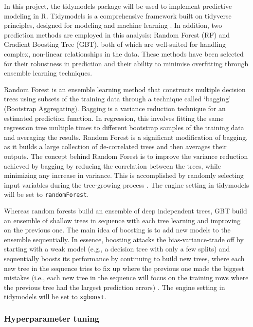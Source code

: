 \documentclass[11pt,a4paper,]{article}
\begin{document}
In this project, the tidymodels package will be used to implement predictive modeling in R. Tidymodels is a comprehensive framework built on tidyverse principles, designed for modeling and machine learning \autocite{tidymodels}. In addition, two prediction methods are employed in this analysis: Random Forest (RF) and Gradient Boosting Tree (GBT), both of which are well-suited for handling complex, non-linear relationships in the data. These methods have been selected for their robustness in prediction and their ability to minimise overfitting through ensemble learning techniques.

Random Forest is an ensemble learning method that constructs multiple decision trees using subsets of the training data through a technique called `bagging' (Bootstrap Aggregating). Bagging is a variance reduction technique for an estimated prediction function. In regression, this involves fitting the same regression tree multiple times to different bootstrap samples of the training data and averaging the results. Random Forest is a significant modification of bagging, as it builds a large collection of de-correlated trees and then averages their outputs. The concept behind Random Forest is to improve the variance reduction achieved by bagging by reducing the correlation between the trees, while minimizing any increase in variance. This is accomplished by randomly selecting input variables during the tree-growing process \autocite{Hastie09,Breiman01}. The engine setting in tidymodels will be set to \texttt{randomForest}.

Whereas random forests build an ensemble of deep independent trees, GBT build an ensemble of shallow trees in sequence with each tree learning and improving on the previous one. The main idea of boosting is to add new models to the ensemble sequentially. In essence, boosting attacks the bias-variance-trade off by starting with a weak model (e.g., a decision tree with only a few splits) and sequentially boosts its performance by continuing to build new trees, where each new tree in the sequence tries to fix up where the previous one made the biggest mistakes (i.e., each new tree in the sequence will focus on the training rows where the previous tree had the largest prediction errors) \autocite{boehmke2019}. The engine setting in tidymodels will be set to \texttt{xgboost}.

\subsubsection{Hyperparameter tuning}\label{hyperparameter-tuning}
\end{document}
